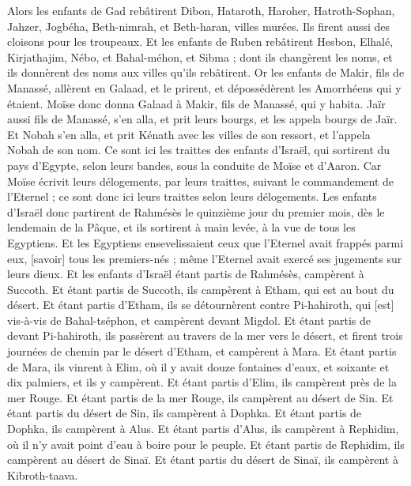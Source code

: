 \begin{multicols}{2}
Alors les enfants de Gad rebâtirent Dibon, Hataroth, Haroher,
Hatroth-Sophan, Jahzer, Jogbéha,
Beth-nimrah, et Beth-haran, villes murées. Ils firent aussi des cloisons pour les troupeaux.
Et les enfants de Ruben rebâtirent Hesbon, Elhalé, Kirjathajim,
Nébo, et Bahal-méhon, et Sibma ; dont ils changèrent les noms, et ils donnèrent des noms aux villes qu'ils rebâtirent.
Or les enfants de Makir, fils de Manassé, allèrent en Galaad, et le prirent, et dépossédèrent les Amorrhéens qui y étaient.
Moïse donc donna Galaad à Makir, fils de Manassé, qui y habita.
Jaïr aussi fils de Manassé, s'en alla, et prit leurs bourgs, et les appela bourgs de Jaïr.
Et Nobah s'en alla, et prit Kénath avec les villes de son ressort, et l'appela Nobah de son nom.
\VerseOne{}Ce sont ici les traittes des enfants d'Israël, qui sortirent du pays d'Egypte, selon leurs bandes, sous la conduite de Moïse et d'Aaron.
Car Moïse écrivit leurs délogements, par leurs traittes, suivant le commandement de l'Eternel ; ce sont donc ici leurs traittes selon leurs délogements.
Les enfants d'Israël donc partirent de Rahmésès le quinzième jour du premier mois, dès le lendemain de la Pâque, et ils sortirent à main levée, à la vue de tous les Egyptiens.
Et les Egyptiens ensevelissaient ceux que l'Eternel avait frappés parmi eux, [savoir] tous les premiers-nés ; même l'Eternel avait exercé ses jugements sur leurs dieux.
Et les enfants d'Israël étant partis de Rahmésès, campèrent à Succoth.
Et étant partis de Succoth, ils campèrent à Etham, qui est au bout du désert.
Et étant partis d'Etham, ils se détournèrent contre Pi-hahiroth, qui [est] vis-à-vis de Bahal-tséphon, et campèrent devant Migdol.
Et étant partis de devant Pi-hahiroth, ils passèrent au travers de la mer vers le désert, et firent trois journées de chemin par le désert d'Etham, et campèrent à Mara.
Et étant partis de Mara, ils vinrent à Elim, où il y avait douze fontaines d'eaux, et soixante et dix palmiers, et ils y campèrent.
Et étant partis d'Elim, ils campèrent près de la mer Rouge.
Et étant partis de la mer Rouge, ils campèrent au désert de Sin.
Et étant partis du désert de Sin, ils campèrent à Dophka.
Et étant partis de Dophka, ils campèrent à Alus.
Et étant partis d'Alus, ils campèrent à Rephidim, où il n'y avait point d'eau à boire pour le peuple.
Et étant partis de Rephidim, ils campèrent au désert de Sinaï.
Et étant partis du désert de Sinaï, ils campèrent à Kibroth-taava.

\end{multicols}
